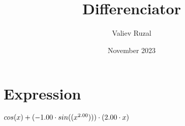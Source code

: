 \documentclass[a4paper, 12pt]{article}
\title{ Differenciator }
\author{Valiev Ruzal}
\date{November 2023}
\begin{document}
\maketitle
\section{Expression}
$ cos( x )  +  ( -1.00 \cdot  sin(  (  { x } ^ {\small 2.00 }  )  )  )  \cdot  ( 2.00 \cdot x ) $
\end{document}
